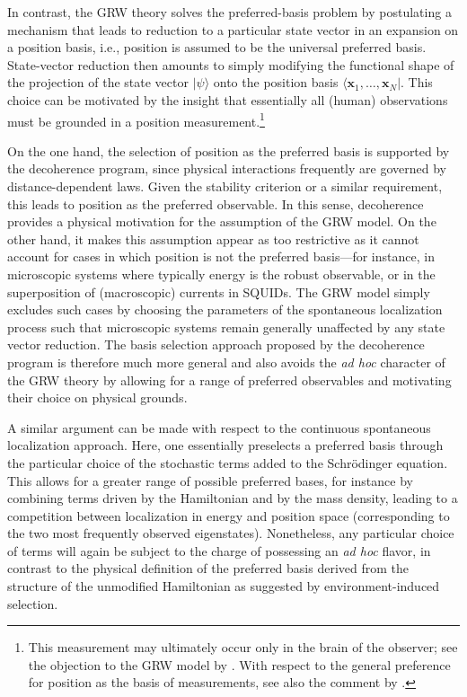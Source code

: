 \documentclass[rmp,aps,amsmath,amsfonts,noshowkeys,noshowpacs,12pt]{revtex4}
\newcommand{\ket}[1]{\ensuremath{|{#1\rangle}}}
\newcommand{\bra}[1]{\ensuremath{{\langle #1}|}}
\begin{document}
In contrast, the GRW theory solves the preferred-basis problem by
postulating a mechanism that leads to reduction to a particular state
vector in an expansion on a position basis, i.e., position is assumed
to be the universal preferred basis. State-vector reduction then
amounts to simply modifying the functional shape of the projection of
the state vector $\ket{\psi}$ onto the position basis
$\bra{\mathbf{x}_1, \hdots, \mathbf{x}_N}$.  This choice can be
motivated by the insight that essentially all (human) observations
must be grounded in a position measurement.\footnote{This measurement
  may ultimately occur only in the brain of the observer; see the
  objection to the GRW model by \citet{Albert:1989:ps}. With respect
  to the general preference for position as the basis of measurements,
  see also the comment by \citet{Bell:1982:ag}.}

On the one hand, the selection of position as the preferred basis is
supported by the decoherence program, since physical interactions
frequently are governed by distance-dependent laws. Given the
stability criterion or a similar requirement, this leads to position
as the preferred observable. In this sense, decoherence provides a
physical motivation for the assumption of the GRW model.  On the other
hand, it makes this assumption appear as too restrictive as it cannot
account for cases in which position is not the preferred basis---for
instance, in microscopic systems where typically energy is the robust
observable, or in the superposition of (macroscopic) currents in
SQUIDs. The GRW model simply excludes such cases by choosing the
parameters of the spontaneous localization process such that
microscopic systems remain generally unaffected by any state vector
reduction.  The basis selection approach proposed by the decoherence
program is therefore much more general and also avoids the \emph{ad
  hoc} character of the GRW theory by allowing for a range of
preferred observables and motivating their choice on physical grounds.

A similar argument can be made with respect to the continuous
spontaneous localization approach. Here, one essentially preselects a
preferred basis through the particular choice of the stochastic terms
added to the Schr\"odinger equation.  This allows for a greater range
of possible preferred bases, for instance by combining terms driven by
the Hamiltonian and by the mass density, leading to a competition
between localization in energy and position space (corresponding to
the two most frequently observed eigenstates).  Nonetheless, any
particular choice of terms will again be subject to the charge of
possessing an \emph{ad hoc} flavor, in contrast to the physical
definition of the preferred basis derived from the structure of the
unmodified Hamiltonian as suggested by environment-induced selection.
\end{document}

